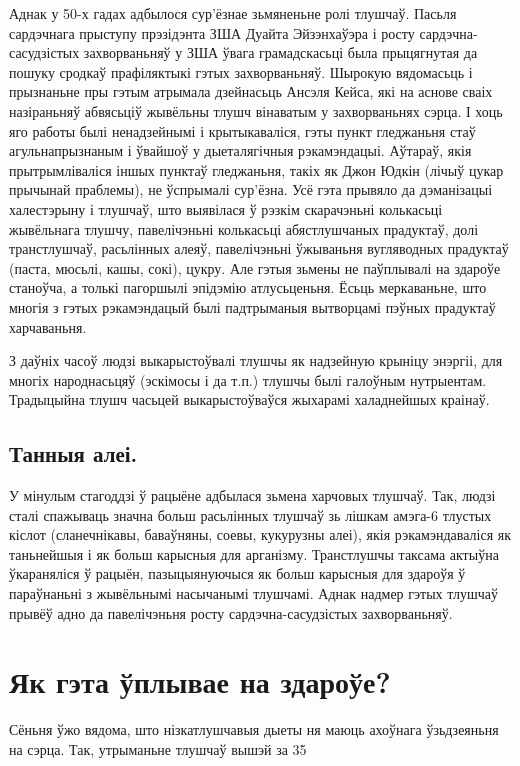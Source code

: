 Аднак у 50-х гадах адбылося сур'ёзнае зьмяненьне ролі тлушчаў. Пасьля сардэчнага прыступу прэзідэнта ЗША Дуайта Эйзэнхаўэра і росту сардэчна-сасудзістых захворваньняў у ЗША ўвага грамадскасьці была прыцягнутая да пошуку сродкаў прафіляктыкі гэтых захворваньняў. Шырокую вядомасьць і прызнаньне пры гэтым атрымала дзейнасьць Ансэля Кейса, які на аснове сваіх назіраньняў абвясьціў жывёльны тлушч вінаватым у захворваньнях сэрца. І хоць яго работы былі ненадзейнымі і крытыкаваліся, гэты пункт гледжаньня стаў агульнапрызнаным і ўвайшоў у дыеталягічныя рэкамэндацыі. Аўтараў, якія прытрымліваліся іншых пунктаў гледжаньня, такіх як Джон Юдкін (лічыў цукар прычынай праблемы), не ўспрымалі сур'ёзна. Усё гэта прывяло да дэманізацыі халестэрыну і тлушчаў, што выявілася ў рэзкім скарачэньні колькасьці жывёльнага тлушчу, павелічэньні колькасьці абястлушчаных прадуктаў, долі транстлушчаў, расьлінных алеяў, павелічэньні ўжываньня вугляводных прадуктаў (паста, мюсьлі, кашы, сокі), цукру. Але гэтыя зьмены не паўплывалі на здароўе станоўча, а толькі пагоршылі эпідэмію атлусьценьня. Ёсьць меркаваньне, што многія з гэтых рэкамэндацый былі падтрыманыя вытворцамі пэўных прадуктаў харчаваньня.

З даўніх часоў людзі выкарыстоўвалі тлушчы як надзейную крыніцу энэргіі, для многіх народнасьцяў (эскімосы і да т.п.) тлушчы былі галоўным нутрыентам. Традыцыйна тлушч часьцей выкарыстоўваўся жыхарамі халаднейшых краінаў.

\subsection{Танныя алеі.}
У мінулым стагоддзі ў рацыёне адбылася зьмена харчовых тлушчаў. Так, людзі сталі спажываць значна больш расьлінных тлушчаў зь лішкам амэга-6 тлустых кіслот (сланечнікавы, баваўняны, соевы, кукурузны алеі), якія рэкамэндаваліся як таньнейшыя і як больш карысныя для арганізму. Транстлушчы таксама актыўна ўкараняліся ў рацыён, пазыцыянуючыся як больш карысныя для здароўя ў параўнаньні з жывёльнымі насычанымі тлушчамі. Аднак надмер гэтых тлушчаў прывёў адно да павелічэньня росту сардэчна-сасудзістых захворваньняў.

\section{Як гэта ўплывае на здароўе?}

Сёньня ўжо вядома, што нізкатлушчавыя дыеты ня маюць ахоўнага ўзьдзеяньня на сэрца. Так, утрыманьне тлушчаў вышэй за 35%

